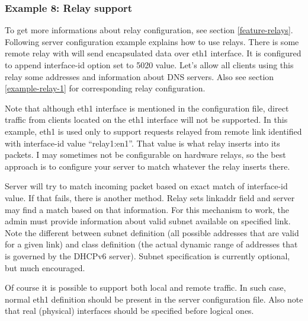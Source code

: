 \subsubsection{Example 8: Relay support}
\label{example-server-relay1}
To get more informations about relay configuration, see section \ref{feature-relays}.
Following server configuration example explains how to use
relays. There is some remote relay with will send encapsulated data over
eth1 interface. It is configured to append interface-id option set to
5020 value. Let's allow all clients using this relay some addresses
and information about DNS servers. Also see section
\ref{example-relay-1} for corresponding relay configuration.

Note that although eth1 interface is mentioned in the configuration file,
direct traffic from clients located on the eth1 interface will not be
supported. In this example, eth1 is used only to support requests
relayed from remote link identified with interface-id value
``relay1:en1''. That value is what relay inserts into its packets. I
may sometimes not be configurable on hardware relays, so the best
approach is to configure your server to match whatever the relay
inserts there.

Server will try to match incoming packet based on exact match of
interface-id value. If that fails, there is another method. Relay sets
linkaddr field and server may find a match based on that
information. For this mechanism to work, the admin must provide
information about valid subnet available on specified link. Note the
different between subnet definition (all possible addresses that are
valid for a given link) and class definition (the actual dynamic range
of addresses that is governed by the DHCPv6 server). Subnet
specification is currently optional, but much encouraged.

Of course it is possible to support both local and remote traffic. In
such case, normal eth1 definition should be present in the server
configuration file. Also note that real (physical) interfaces should
be specified before logical ones.

